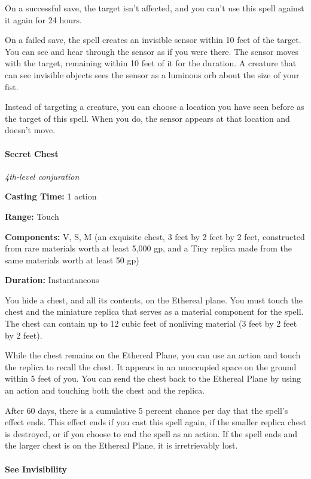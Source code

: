 \documentclass[
]{article}
\begin{document}
On a successful save, the target isn't affected, and you can't use this
spell against it again for 24 hours.

On a failed save, the spell creates an invisible sensor within 10 feet
of the target. You can see and hear through the sensor as if you were
there. The sensor moves with the target, remaining within 10 feet of it
for the duration. A creature that can see invisible objects sees the
sensor as a luminous orb about the size of your fist.

Instead of targeting a creature, you can choose a location you have seen
before as the target of this spell. When you do, the sensor appears at
that location and doesn't move.

\hypertarget{secret-chest}{%
\paragraph{Secret Chest}\label{secret-chest}}

\emph{4th-level conjuration}

\textbf{Casting Time:} 1 action

\textbf{Range:} Touch

\textbf{Components:} V, S, M (an exquisite chest, 3 feet by 2 feet by 2
feet, constructed from rare materials worth at least 5,000 gp, and a
Tiny replica made from the same materials worth at least 50 gp)

\textbf{Duration:} Instantaneous

You hide a chest, and all its contents, on the Ethereal plane. You must
touch the chest and the miniature replica that serves as a material
component for the spell. The chest can contain up to 12 cubic feet of
nonliving material (3 feet by 2 feet by 2 feet).

While the chest remains on the Ethereal Plane, you can use an action and
touch the replica to recall the chest. It appears in an unoccupied space
on the ground within 5 feet of you. You can send the chest back to the
Ethereal Plane by using an action and touching both the chest and the
replica.

After 60 days, there is a cumulative 5 percent chance per day that the
spell's effect ends. This effect ends if you cast this spell again, if
the smaller replica chest is destroyed, or if you choose to end the
spell as an action. If the spell ends and the larger chest is on the
Ethereal Plane, it is irretrievably lost.

\hypertarget{see-invisibility}{%
\paragraph{See Invisibility}\label{see-invisibility}}
\end{document}
